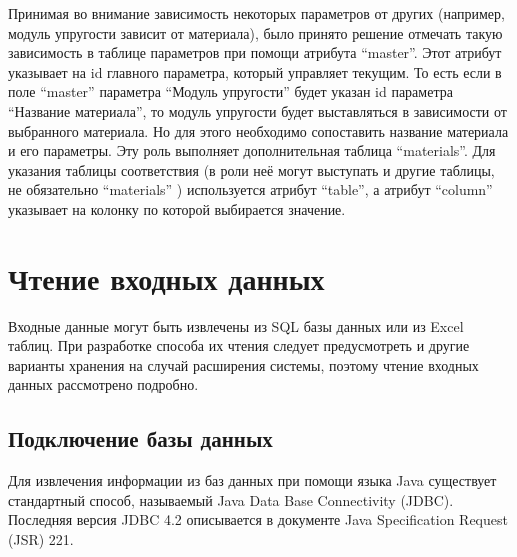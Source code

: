 \documentclass[14pt,oneside,final]{extreport}
\begin{document}
	Принимая во внимание зависимость некоторых параметров от других (например, модуль упругости зависит от материала), было принято решение отмечать такую зависимость в таблице параметров при помощи атрибута ``master''. Этот атрибут указывает на id главного параметра, который управляет текущим. То есть если в поле ``master'' параметра ``Модуль упругости'' будет указан id параметра ``Название материала'', то модуль упругости будет выставляться в зависимости от выбранного материала. Но для этого необходимо сопоставить название материала и его параметры. Эту роль выполняет дополнительная таблица ``materials''. Для указания таблицы соответствия (в роли неё могут выступать и другие таблицы, не обязательно ``materials'' ) используется атрибут ``table'', а атрибут ``column'' указывает на колонку по которой выбирается значение. 

	
	\section{Чтение входных данных}
	Входные данные могут быть извлечены из SQL базы данных или из Excel таблиц. При разработке способа их чтения следует предусмотреть и другие варианты хранения на случай расширения системы, поэтому чтение входных данных рассмотрено подробно. 
	
	\subsection{Подключение базы данных}
	Для извлечения информации из баз данных при помощи языка Java существует стандартный способ, называемый Java Data Base Connectivity (JDBC). Последняя версия JDBC 4.2 описывается в документе Java Specification Request (JSR) 221. 
	
\end{document}
